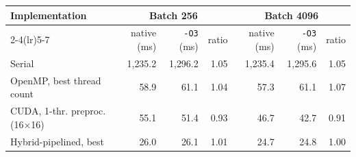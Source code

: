 \begin{tabular}{lrrrrrr}
\toprule
Implementation & \multicolumn{3}{c}{Batch 256} & \multicolumn{3}{c}{Batch 4096} \\
\cmidrule(lr){2-4}\cmidrule(lr){5-7}
 & native (ms) & \texttt{-O3} (ms) & ratio & native (ms) & \texttt{-O3} (ms) & ratio \\
\midrule
Serial & 1{,}235.2 & 1{,}296.2 & 1.05 & 1{,}235.4 & 1{,}295.6 & 1.05 \\
OpenMP, best thread count & 58.9 & 61.1 & 1.04 & 57.3 & 61.1 & 1.07 \\
CUDA, 1-thr. preproc. (16$\times$16) & 55.1 & 51.4 & 0.93 & 46.7 & 42.7 & 0.91 \\
Hybrid-pipelined, best & 26.0 & 26.1 & 1.01 & 24.7 & 24.8 & 1.00 \\
\bottomrule
\end{tabular}
